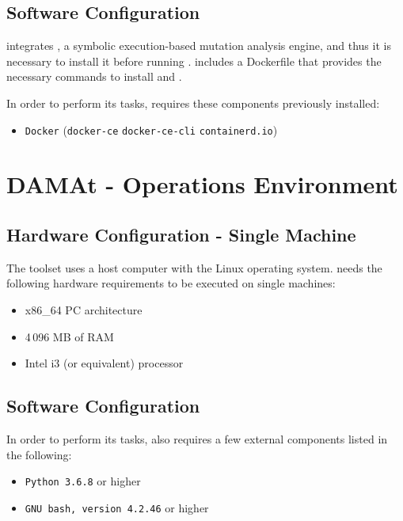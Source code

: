 \section{Software Configuration}

\SEMUS integrates \SEMU, a symbolic execution-based mutation analysis engine, and thus it is necessary to install it before running \SEMUS. \SEMUS includes a Dockerfile that provides the necessary commands to install \SEMU and \SEMUS.

In order to perform its tasks, \SEMUS requires these components previously installed:

\begin{itemize}
	\item \texttt{Docker} (\texttt{docker-ce} \texttt{docker-ce-cli} \texttt{containerd.io})
\end{itemize}


\chapter{DAMAt - Operations Environment}
\label{chapter:dama:operationsEnv}

\section{Hardware Configuration - Single Machine}

The \DAMA toolset uses a host computer with the Linux operating system. \DAMA needs the following hardware requirements to be executed on single machines:

\begin{itemize}
	\item x86\_64 PC architecture
	\item 4\,096 MB of RAM
	\item Intel i3 (or equivalent) processor
\end{itemize}

%
%

\section{Software Configuration}

In order to perform its tasks, \DAMA also requires a few external components listed in the following:

\begin{itemize}
	\item \texttt{Python 3.6.8} or higher
	\item \texttt{GNU bash, version 4.2.46} or higher
\end{itemize}
